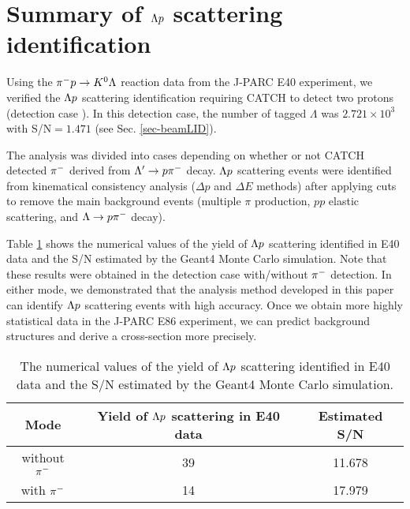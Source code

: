 \clearpage
\section{Summary of $\Lambda p$ scattering identification}
\label{sec-2p_summary}

Using the $\pi^- p \to K^0 \Lambda$ reaction data from the J-PARC E40 experiment, we verified the $\Lambda p$ scattering identification requiring CATCH to detect two protons (detection case ). In this detection case, the number of tagged $\Lambda$ was $2.721\times10^{3}$ with S/N$=1.471$ (see Sec. \ref{sec-beamLID}). 

The analysis was divided into cases depending on whether or not CATCH detected $\pi^{-}$ derived from $\Lambda'\to p\pi^{-}$ decay. $\Lambda p$ scattering events were identified from kinematical consistency analysis ($\Delta p$ and $\Delta E$ methods) after applying cuts to remove the main background events (multiple $\pi$ production, $pp$ elastic scattering, and $\Lambda\to p\pi^{-}$ decay).

Table \ref{tab-2p_summary} shows the numerical values of the yield of $\Lambda p$ scattering identified in E40 data and the S/N estimated by the Geant4 Monte Carlo simulation. Note that these results were obtained in the detection case  with/without $\pi^{-}$ detection. In either mode, we demonstrated that the analysis method developed in this paper can identify $\Lambda p$ scattering events with high accuracy. Once we obtain more highly statistical data in the J-PARC E86 experiment, we can predict background structures and derive a cross-section more precisely.

\begin{table}[!tbph]
  \begin{center}
    \caption{The numerical values of the yield of $\Lambda p$ scattering identified in E40 data and the S/N estimated by the Geant4 Monte Carlo simulation. }
    \begin{tabular}{ccc}
      Mode & Yield of $\Lambda p$ scattering in E40 data& Estimated S/N \\ \hline \hline
      without $\pi^{-}$ & 39 & 11.678 \\ \hline
      with $\pi^{-}$ & 14 & 17.979 \\
    \end{tabular}
    \label{tab-2p_summary}
  \end{center}
\end{table}



%